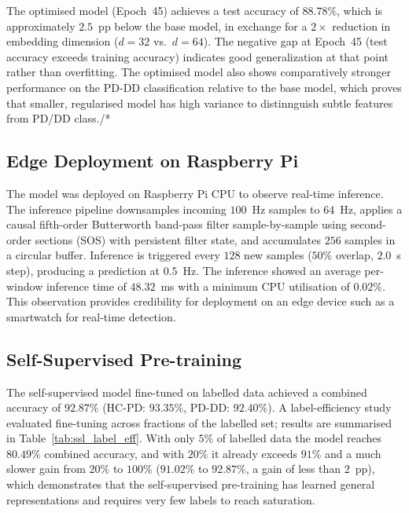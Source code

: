 \documentclass[conference]{IEEEtran}
\begin{document}
The optimised model (Epoch~45) achieves a test accuracy of $88.78\%$, which is approximately $2.5$~pp below the base model, in exchange for a $2\times$ reduction in embedding dimension ($d{=}32$ vs.\ $d{=}64$). The negative gap at Epoch~45 (test accuracy exceeds training accuracy) indicates good generalization at that point rather than overfitting. The optimised model also shows comparatively stronger performance on the PD-DD classification relative to the base model, which proves that smaller,  regularised model has high variance to distinnguish subtle features from PD/DD class./*

\subsection{Edge Deployment on Raspberry Pi}
\label{sec:pi}
The model was deployed on Raspberry Pi CPU to observe real-time inference. The inference pipeline downsamples incoming $100$~Hz samples to $64$~Hz, applies a causal fifth-order Butterworth band-pass filter sample-by-sample using second-order sections (SOS) with persistent filter state, and accumulates $256$ samples in a circular buffer. Inference is triggered every $128$ new samples ($50$\% overlap, $2.0$~s step), producing a prediction at $0.5$~Hz.
The inference showed an average per-window inference time of $48.32$~ms with a minimum CPU utilisation of $0.02\%$. This observation provides credibility for deployment on an edge device such as a smartwatch for real-time detection.

\subsection{Self-Supervised Pre-training }
The self-supervised model fine-tuned on labelled data achieved a combined accuracy of $92.87\%$ (HC-PD: $93.35\%$, PD-DD: $92.40\%$). A label-efficiency study evaluated fine-tuning across fractions of the labelled set; results are summarised in Table~\ref{tab:ssl_label_eff}. With only $5\%$ of labelled data the model reaches $80.49\%$ combined accuracy, and with $20\%$ it already exceeds $91\%$ and a much slower gain from $20\%$ to $100\%$ ($91.02\%$ to $92.87\%$, a gain of less than $2$~pp), which demonstrates that the self-supervised pre-training has learned general representations and  requires very few labels to reach saturation.
\end{document}
